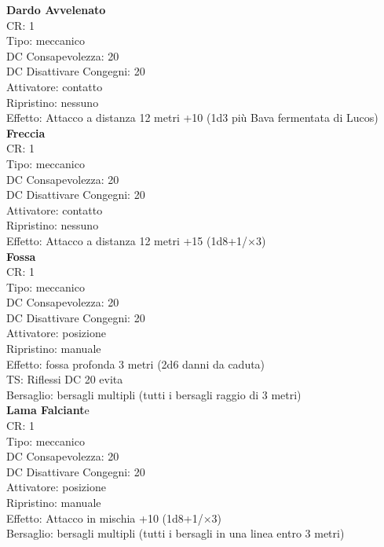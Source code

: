 \documentclass[a4paper,11pt,twoside,openany]{book}
\begin{document}
\begin{multicols}{2}

	\textbf{Dardo Avvelenato}\\
	CR: 1 \\
	Tipo: meccanico \\
	DC Consapevolezza: 20 \\
	DC Disattivare Congegni: 20 \\
	Attivatore: contatto \\
	Ripristino: nessuno \\
	Effetto: Attacco a distanza 12 metri +10 (1d3 più Bava fermentata di Lucos)\\

	\textbf{Freccia}\\
	CR: 1 \\
	Tipo: meccanico \\
	DC Consapevolezza: 20 \\
	DC Disattivare Congegni: 20 \\
	Attivatore: contatto \\
	Ripristino: nessuno \\
	Effetto: Attacco a distanza 12 metri +15 (1d8+1/×3)\\

	\textbf{Fossa}\\
	CR: 1 \\
	Tipo: meccanico \\
	DC Consapevolezza: 20 \\
	DC Disattivare Congegni: 20 \\
	Attivatore: posizione \\
	Ripristino: manuale \\
	Effetto: fossa profonda 3 metri (2d6 danni da caduta) \\
	TS: Riflessi DC 20 evita \\
	Bersaglio: bersagli multipli (tutti i bersagli raggio di 3 metri)\\

	\textbf{Lama Falciant}e\\
	CR: 1 \\
	Tipo: meccanico \\
	DC Consapevolezza: 20 \\
	DC Disattivare Congegni: 20 \\
	Attivatore: posizione \\
	Ripristino: manuale \\
	Effetto: Attacco in mischia +10 (1d8+1/×3) \\
	Bersaglio: bersagli multipli (tutti i bersagli in una linea entro 3 metri)\\


\end{multicols}
\end{document}
